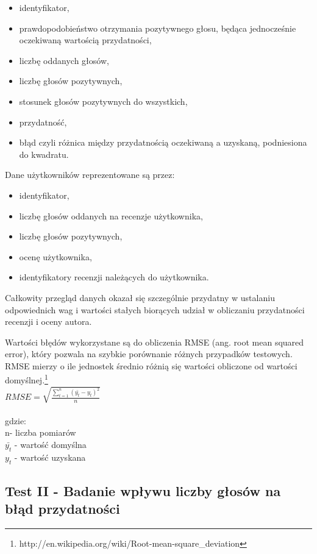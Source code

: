 \begin{itemize}
\item identyfikator,
\item prawdopodobieństwo otrzymania pozytywnego głosu, będąca jednocześnie oczekiwaną wartością przydatności,
\item liczbę oddanych głosów,
\item liczbę głosów pozytywnych,
\item stosunek głosów pozytywnych do wszystkich,
\item przydatność,
\item błąd czyli różnica między przydatnością oczekiwaną a uzyskaną, podniesiona do kwadratu.
\end{itemize}

Dane użytkowników reprezentowane są przez:

\begin{itemize}
\item identyfikator,
\item liczbę głosów oddanych na recenzje użytkownika,
\item liczbę głosów pozytywnych,
\item ocenę użytkownika,
\item identyfikatory recenzji należących do użytkownika.
\end{itemize}

Całkowity przegląd danych okazał się szczególnie przydatny w ustalaniu odpowiednich wag i wartości stałych biorących udział w obliczaniu przydatności recenzji i oceny autora.

Wartości błędów wykorzystane są do obliczenia RMSE (ang. root mean squared error), który pozwala na szybkie porównanie różnych przypadków testowych. RMSE mierzy o ile jednostek średnio różnią się wartości obliczone od wartości domyślnej.\footnote{http://en.wikipedia.org/wiki/Root-mean-square\_deviation}\\

$ RMSE=\sqrt{\frac{\sum_{t=1}^n (\bar{y_{t}}-y_{t})^2}{n}} $\\\\
gdzie:\\
n- liczba pomiarów\\
$\bar{y_{t}}$ - wartość domyślna\\
$y_{t}$ - wartość uzyskana\\

\subsection{Test II - Badanie wpływu liczby głosów na błąd przydatności}

